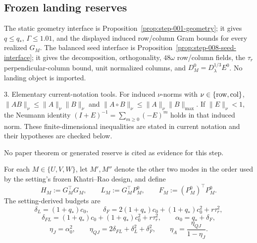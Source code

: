 \subsection{Frozen landing reserves}\label{app:step-009}

The static geometry interface is Proposition~\ref{prop:step-001-geometry}; it
gives \(q\le q_*\), \(\Gamma\le1.01\), and the displayed induced row/column
Gram bounds for every realized \(G_M\). The balanced seed interface is
Proposition~\ref{prop:step-008-seed-interface}; it gives the decomposition,
orthogonality, \(48\omega\) row/column fields, the \(\tau_r\)
perpendicular-column bound, unit normalized columns, and
\(D_M^0=D_\lambda^{1/3}E^0\). No landing object is imported.

3. Elementary current-notation tools. For induced \(\nu\)-norms with
   \(\nu\in\{{\rm row},{\rm col}\}\),
   \(\|AB\|_\nu\le\|A\|_\nu\|B\|_\nu\) and
   \(\|A\circ B\|_\nu\le\|A\|_\nu\|B\|_{\max}\). If
   \(\|E\|_\nu<1\), the Neumann identity
   \((I+E)^{-1}=\sum_{m\ge0}(-E)^m\) holds in that induced norm. These
   finite-dimensional inequalities are stated in current notation and their
   hypotheses are checked below.

No paper theorem or generated reserve is cited as evidence for this step.

For each \(M\in\{U,V,W\}\), let \(M',M''\) denote the other two modes in
the order used by the setting's frozen Khatri--Rao design, and define
\[
 H_M:=G_M^\top G_M,\qquad
 L_M:=G_M^\top P_M^0,\qquad
 F_M:=(P_M^0)^\top P_M^0.
\]
The setting-derived budgets are
\[
\delta_L=(1+q_*)c_0,\qquad
\delta_F=2(1+q_*)c_0+(1+q_*)c_0^2+r\tau_r^2,
\]
\[
\delta_{FL}=(1+q_*)c_0+(1+q_*)c_0^2+r\tau_r^2,\qquad
\alpha_0=q_*+\delta_F,
\]
\[
\eta_J=\alpha_0^2,\qquad
\eta_{QJ}=2\delta_{FL}+\delta_L^2+\delta_F^2,\qquad
\eta_A=\frac{\eta_{QJ}}{1-\eta_J}.
\]


